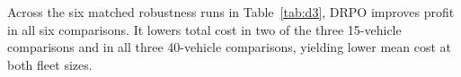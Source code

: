 \documentclass[preprint,12pt,authoryear]{elsarticle}
\begin{document}
Across the six matched robustness runs in Table~\ref{tab:d3}, DRPO improves profit in all six comparisons. It lowers total cost in two of the three 15-vehicle comparisons and in all three 40-vehicle comparisons, yielding lower mean cost at both fleet sizes.



\end{document}
